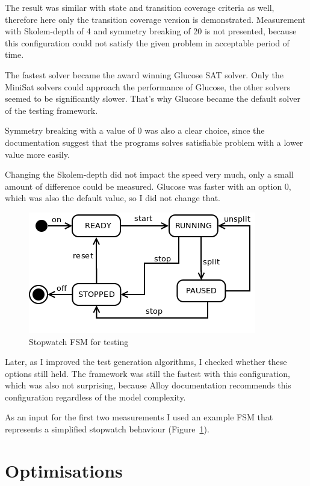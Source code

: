 The result was similar with state and transition coverage criteria as well, therefore here only the transition coverage version is demonstrated. Measurement with Skolem-depth of 4 and symmetry breaking of 20 is not presented, because this configuration could not satisfy the given problem in acceptable period of time.

The fastest solver became the award winning Glucose SAT solver. Only the MiniSat solvers could approach the performance of Glucose, the other solvers seemed to be significantly slower. That's why Glucose became the default solver of the testing framework.

Symmetry breaking with a value of 0 was also a clear choice, since the documentation suggest that the programs solves satisfiable problem with a lower value more easily. 

Changing the Skolem-depth did not impact the speed very much, only a small amount of difference could be measured. Glucose was faster with an option 0, which was also the default value, so I did not change that.

\begin{figure}[htp]
\centering
\includegraphics[scale=0.5]{figures/measurements_stopwatch}
\caption{Stopwatch FSM for testing}
\label{fig:measurements_stopwatch}
\end{figure}

Later, as I improved the test generation algorithms, I checked whether these options still held. The framework was still the fastest with this configuration, which was also not surprising, because Alloy documentation recommends this configuration regardless of the model complexity.

As an input for the first two measurements I used an example FSM that represents a simplified stopwatch behaviour (Figure~\ref{fig:measurements_stopwatch}). 


\section{Optimisations}
\label{sec:optimalisations}

